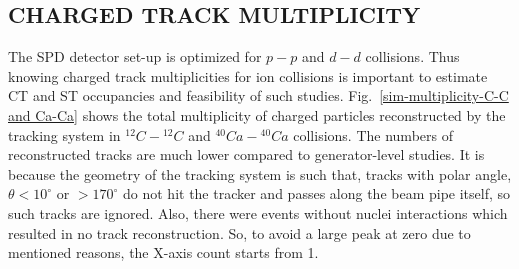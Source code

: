 \documentclass[12pt]{article}
\begin{document}
%
%
%

\subsection{CHARGED TRACK MULTIPLICITY}
\label{CHARGED TRACK MULTIPLICITY, C12-C12}
The SPD detector set-up is optimized for $p-p$ and $d-d$ collisions. Thus knowing
charged track multiplicities for ion collisions is important to estimate
CT and ST occupancies and feasibility of such studies.
Fig.~\ref{sim-multiplicity-C-C and Ca-Ca} shows the total
multiplicity of charged particles reconstructed by the tracking system in
$^{12}C-{^{12}C}$ and $^{40}Ca-{^{40}Ca}$ collisions. 
The numbers of reconstructed tracks are much lower compared to generator-level
studies. It is because the geometry of the tracking system is such that, tracks with polar angle, $\theta < 10^{\circ}$ or $> 170^{\circ}$ do not hit the tracker and passes along the beam pipe itself, so such tracks are ignored. Also, there were events without nuclei interactions which resulted in no track reconstruction. So, to avoid a large peak at zero due to mentioned reasons, the X-axis count starts from 1. 
\end{document}
